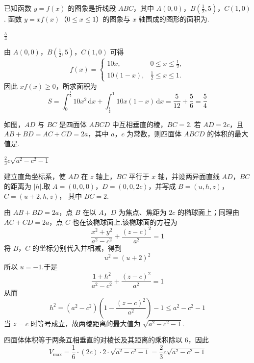 \begin{problem}
已知函数 \( y = f(x) \) 的图象是折线段 \(ABC\)，其中 \( A(0,0) \)，\( B\left(\frac{1}{2}, 5\right) \)，\( C(1,0) \). 函数 \( y = xf(x) \)（\(0 \leqslant x \leqslant 1\)）的图象与 \( x \) 轴围成的图形的面积为\fillinblank{}.
\end{problem}

\begin{answer}
\(\frac{5}{4}\)
\end{answer}

\begin{solution}
由 \(A(0,0)\)，\(B\left(\frac12,5\right)\)，\(C(1,0)\) 可得
\[
f(x)=
\begin{cases}
10x,&0\leqslant x\leqslant\frac12,\\
10(1-x),&\frac12\leqslant x\leqslant1.
\end{cases}
\]
因此 \(xf(x)\geqslant0\)，所求面积为
\[
S=\int_0^{\frac{1}{2}}10x^2\,\mathrm dx
+\int_{\frac{1}{2}}^1 10x(1-x)\,\mathrm dx
=\frac{5}{12}+\frac56=\frac54
\]
\end{solution}

\begin{problem}
如图，\(AD\) 与 \(BC\) 是四面体 \(ABCD\) 中互相垂直的棱，\(BC = 2\). 若 \(AD = 2c\)，且 \(AB + BD = AC + CD = 2a\)，其中 \(a\)，\(c\) 为常数，则四面体 \(ABCD\) 的体积的最大值是\fillinblank{}.
\end{problem}

\begin{answer}
\(\frac{2}{3}c\sqrt{a^{2}-c^{2}-1}\)
\end{answer}

\begin{solution}
建立直角坐标系，使 \(AD\) 在 \(z\) 轴上，\(BC\) 平行于 \(x\) 轴，并设两异面直线 \(AD\)，\(BC\) 的距离为 \(|h|\).取 \(A=(0,0,0)\)，\(D=(0,0,2c)\)，并写成 \(B=(u,h,z)\)，\(C=(u+2,h,z)\)，
其中 \(BC=2\).

由 \(AB+BD=2a\)，点 \(B\) 在以 \(A\)，\(D\) 为焦点、焦距为 \(2c\) 的椭球面上；同理由 \(AC+CD=2a\)，点 \(C\) 也在该椭球面上.该椭球面的方程为
\[
\frac{x^2+y^2}{a^2-c^2}+\frac{(z-c)^2}{a^2}=1
\]
将 \(B\)，\(C\) 的坐标分别代入并相减，得到
\[
u^2=(u+2)^2
\]
所以 \(u=-1\).于是
\[
\frac{1+h^2}{a^2-c^2}+\frac{(z-c)^2}{a^2}=1
\]
从而
\[
h^2=(a^2-c^2)\left(1-\frac{(z-c)^2}{a^2}\right)-1
\leqslant a^2-c^2-1
\]
当 \(z=c\) 时等号成立，故两棱距离的最大值为 \(\sqrt{a^2-c^2-1}\).

四面体体积等于两条互相垂直的对棱长及其距离的乘积除以 \(6\)，因此
\[
V_{\max}=\frac16\cdot(2c)\cdot2\cdot\sqrt{a^2-c^2-1}
=\frac23c\sqrt{a^2-c^2-1}
\]
\end{solution}


